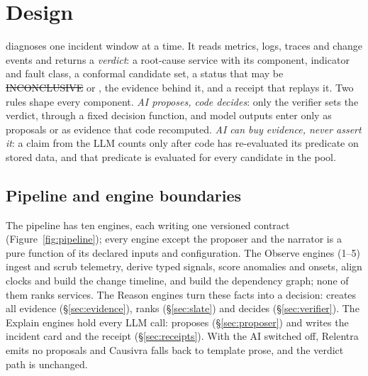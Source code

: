 \section{Design}
\label{sec:design}

\sys diagnoses one incident window at a time.
It reads metrics, logs, traces and change events and returns a \emph{verdict}: a root-cause service with its component, indicator and fault class, a conformal candidate set, a status that may be \st{INCONCLUSIVE} or \NOFAULT, the evidence behind it, and a receipt that replays it.
Two rules shape every component.
\emph{AI proposes, code decides}: only the verifier sets the verdict, through a fixed decision function, and model outputs enter only as proposals or as evidence that code recomputed.
\emph{AI can buy evidence, never assert it}: a claim from the LLM counts only after code has re-evaluated its predicate on stored data, and that predicate is evaluated for every candidate in the pool.


\subsection{Pipeline and engine boundaries}
\label{sec:pipeline}

The pipeline has ten engines, each writing one versioned contract (Figure~\ref{fig:pipeline}); every engine except the proposer and the narrator is a pure function of its declared inputs and configuration.
The Observe engines (1--5) ingest and scrub telemetry, derive typed signals, score anomalies and onsets, align clocks and build the change timeline, and build the dependency graph; none of them ranks services.
The Reason engines turn these facts into a decision:  creates all evidence (\S\ref{sec:evidence}),  ranks (\S\ref{sec:slate}) and  decides (\S\ref{sec:verifier}).
The Explain engines hold every LLM call:  proposes (\S\ref{sec:proposer}) and  writes the incident card and the receipt (\S\ref{sec:receipts}).
With the AI switched off, Relentra emits no proposals and Causivra falls back to template prose, and the verdict path is unchanged.

